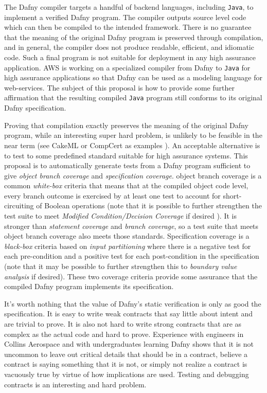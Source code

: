 \documentclass[11pt,onecolumn,notitlepage]{article}
\begin{document}
The Dafny compiler targets a handful of backend languages, including \texttt{Java}, to implement a verified Dafny program. The compiler outputs source level code which can then be compiled to the intended framework. There is no guarantee that the meaning of the original Dafny program is preserved through compilation, and in general, the compiler does not produce readable, efficient, and idiomatic code. Such a final program is not suitable for deployment in any high assurance application. AWS is working on a specialized compiler from Dafny to \texttt{Java} for high assurance applications so that Dafny can be used as a modeling language for web-services.  The subject of this proposal is how to provide some further affirmation that the resulting compiled \texttt{Java} program still conforms to its original Dafny specification. 

Proving that compilation exactly preserves the meaning of the original Dafny program, while an interesting super hard problem, is unlikely to be feasible in the near term (see CakeML or CompCert as examples \cite{cakeml, compcert}). An acceptable alternative is to test to some predefined standard suitable for high assurance systems. This proposal is to automatically generate tests from a Dafny program sufficient to give \emph{object branch coverage} and \emph{specification coverage}. object branch coverage is a common \emph{white-box} criteria that means that at the compiled object code level, every branch outcome is exercised by at least one test to account for short-circuiting of Boolean operations (note that it is possible to further strengthen the test suite to meet \emph{Modified Condition/Decision Coverage} if desired \cite{7194601}). It is stronger than \emph{statement coverage} and \emph{branch coverage}, so a test suite that meets object branch coverage also meets those standards. Specification coverage is a \emph{black-box} criteria based on \emph{input partitioning} where there is a negative test for each pre-condition and a positive test for each post-condition in the specification (note that it may be possible to further strengthen this to \emph{boundary value analysis} if desired). These two coverage criteria provide some assurance that the compiled Dafny program implements its specification.

It's worth nothing that the value of Dafny's static verification is only as good the specification. It is easy to write weak contracts that say little about intent and are trivial to prove. It is also not hard to write strong contracts that are as complex as the actual code and hard to prove. Experience with engineers in Collins Aerospace and with undergraduates learning Dafny shows that it is not uncommon to leave out critical details that should be in a contract, believe a contract is saying something that it is not, or simply not realize a contract is vacuously true by virtue of how implications are used. Testing and debugging contracts is an interesting and hard problem. 
\end{document}
